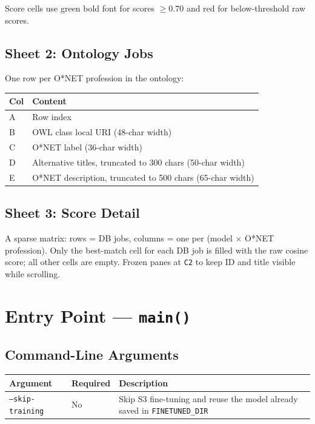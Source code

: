 ﻿\documentclass[12pt,a4paper]{article}
\begin{document}
Score cells use green bold font for scores $\geq 0.70$ and red for below-threshold raw scores.

\subsection{Sheet 2: Ontology Jobs}

One row per O*NET profession in the ontology:

\begin{longtable}{@{}P{2cm}P{13.5cm}@{}}
\toprule
\textbf{Col} & \textbf{Content} \\
\midrule
\endhead
A & Row index \\
B & OWL class local URI (48-char width) \\
C & O*NET label (36-char width) \\
D & Alternative titles, truncated to 300 chars (50-char width) \\
E & O*NET description, truncated to 500 chars (65-char width) \\
\bottomrule
\end{longtable}

\subsection{Sheet 3: Score Detail}

A sparse matrix: rows = DB jobs, columns = one per (model $\times$ O*NET profession). Only the best-match cell for each DB job is filled with the raw cosine score; all other cells are empty. Frozen panes at \texttt{C2} to keep ID and title visible while scrolling.

\clearpage
\section{Entry Point --- \texttt{main()}}

\subsection{Command-Line Arguments}

\begin{longtable}{@{}P{4cm}P{2.5cm}P{9cm}@{}}
\toprule
\textbf{Argument} & \textbf{Required} & \textbf{Description} \\
\midrule
\endhead
\texttt{--skip-training} & No & Skip S3 fine-tuning and reuse the model already saved in \texttt{FINETUNED\_DIR} \\
\bottomrule
\end{longtable}
\end{document}
